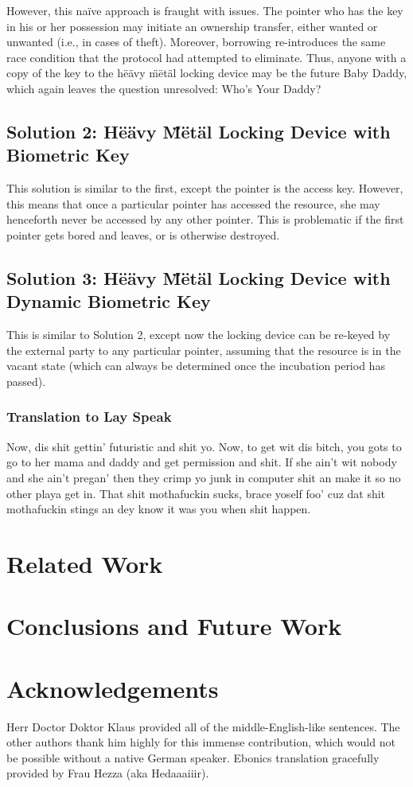 \documentclass[10pt,twocolumn,letterpaper]{article}
\begin{document}
However, this na\"{i}ve approach is fraught with issues. The pointer who has the key in his or her possession may initiate an ownership transfer, either wanted or unwanted (i.e., in cases of theft). Moreover, borrowing re-introduces the same race condition that the protocol had attempted to eliminate. Thus, anyone with a copy of the key to the h\"{e}\"{a}vy \"{m}\"{e}t\"{a}l locking device may be the future Baby Daddy, which again leaves the question unresolved: Who's Your Daddy?

\subsection{Solution 2: H\"{e}\"{a}vy \"{M}\"{e}t\"{a}l Locking Device with Biometric Key}
This solution is similar to the first, except the pointer is the access key. However, this means that once a particular pointer has accessed the resource, she may henceforth never be accessed by any other pointer. This is problematic if the first pointer gets bored and leaves, or is otherwise destroyed.

\subsection{Solution 3: H\"{e}\"{a}vy \"{M}\"{e}t\"{a}l Locking Device with Dynamic Biometric Key}
This is similar to Solution 2, except now the locking device can be re-keyed by the external party to any particular pointer, assuming that the resource is in the vacant state (which can always be determined once the incubation period has passed).

\subsubsection{Translation to Lay Speak}
Now, dis shit gettin' futuristic and shit yo. Now, to get wit dis bitch, you gots to go to her mama and daddy and get permission and shit. If she ain't wit nobody and she ain't pregan' then they crimp yo junk in computer shit an make it so no other playa get in. That shit mothafuckin sucks, brace yoself foo' cuz dat shit mothafuckin stings an dey know it was you when shit happen.

\section{Related Work}

\section{Conclusions and Future Work}


\section{Acknowledgements}
Herr Doctor Doktor Klaus provided all of the middle-English-like sentences. The other authors thank him highly for this immense contribution, which would not be possible without a native German speaker. Ebonics translation gracefully provided by Frau Hezza (aka Hedaaaiiir).
\end{document}

